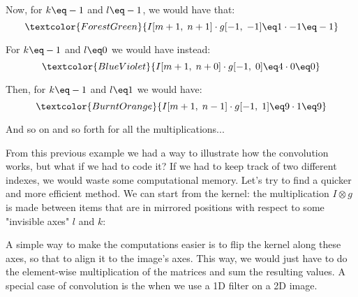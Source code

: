 \begin{example}
    Now, for $k \eq -1$ and $l \eq -1$, we would have that:
    \[ \textcolor{ForestGreen}{I[m + 1, \; n + 1] \cdot g[-1, \; -1] \eq 1 \cdot -1 \eq -1} \]

    For $k \eq -1$ and $l \eq 0$ we would have instead:
    \[ \textcolor{BlueViolet}{I[m + 1, \; n + 0] \cdot g[-1, \; 0] \eq 4 \cdot 0 \eq 0} \]

    Then, for $k \eq -1$ and $l \eq 1$ we would have:
    \[ \textcolor{BurntOrange}{I[m + 1, \; n - 1] \cdot g[-1, \; 1] \eq 9 \cdot 1 \eq 9} \]

    And so on and so forth for all the multiplications...
\end{example}

From this previous example we had a way to illustrate how the convolution works, but what if we had to code it? If we had to keep track of two different indexes, we would waste some computational memory. Let's try to find a quicker and more efficient method. We can start from the kernel: the multiplication $I \otimes g$ is made between items that are in mirrored positions with respect to some "invisible axes" $l$ and $k$:

\begin{center}
\end{center}

A simple way to make the computations easier is to flip the kernel along these axes, so that to align it to the image's axes. This way, we would just have to do the element-wise multiplication of the matrices and sum the resulting values.
\nl
A special case of convolution is the when we use a 1D filter on a 2D image.